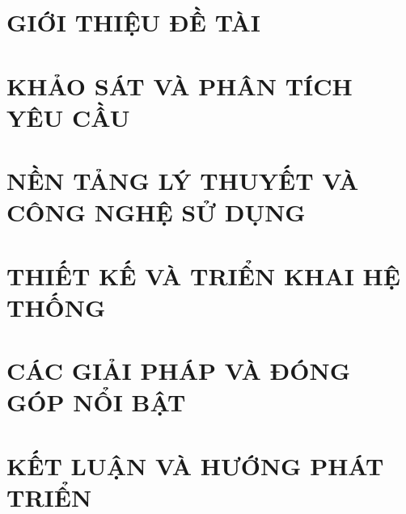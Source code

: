 \documentclass[a4paper,12pt,twoside]{report}
\begin{document}




\newpage

\newpage

\newpage

\renewcommand*\contentsname{MỤC LỤC}
\tableofcontents
\newpage

\renewcommand{\listfigurename}{DANH MỤC HÌNH VẼ}
{\let\oldnumberline\numberline
\renewcommand{\numberline}{Hình~\oldnumberline}
\listoffigures}
\newpage

\renewcommand{\listtablename}{DANH MỤC BẢNG BIỂU}
{\let\oldnumberline\numberline
\renewcommand{\numberline}{Bảng~\oldnumberline}
\listoftables}
\newpage


\newpage

\pagestyle{fancy}

\chapter{GIỚI THIỆU ĐỀ TÀI}
\label{chapter:introduction}


\chapter{KHẢO SÁT VÀ PHÂN TÍCH YÊU CẦU}
\label{chapter:requirements}


\chapter{NỀN TẢNG LÝ THUYẾT VÀ CÔNG NGHỆ SỬ DỤNG}
\label{chapter:technology}


\chapter{THIẾT KẾ VÀ TRIỂN KHAI HỆ THỐNG}
\label{chapter:design}


\chapter{CÁC GIẢI PHÁP VÀ ĐÓNG GÓP NỔI BẬT}
\label{chapter:contributions}


\chapter{KẾT LUẬN VÀ HƯỚNG PHÁT TRIỂN}
\label{chapter:conclusion}


\newpage
\renewcommand\bibname{TÀI LIỆU THAM KHẢO}
\printbibliography
{}
\end{document}
